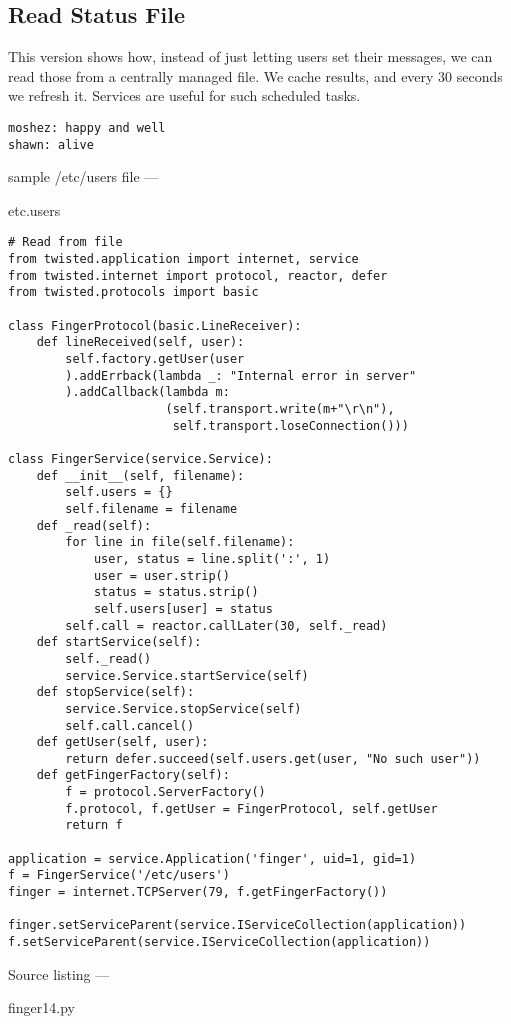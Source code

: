 \subsection{Read Status File}


This version shows how, instead of just letting users set their messages, we can read those from a centrally managed file. We cache results, and every 30 seconds we refresh it. Services are useful for such scheduled tasks.\begin{verbatim}
moshez: happy and well
shawn: alive
\end{verbatim}\parbox[b]{\linewidth}{\begin{center}sample /etc/users file --- \begin{em}etc.users\end{em}\end{center}}\begin{verbatim}
# Read from file
from twisted.application import internet, service
from twisted.internet import protocol, reactor, defer
from twisted.protocols import basic

class FingerProtocol(basic.LineReceiver):
    def lineReceived(self, user):
        self.factory.getUser(user
        ).addErrback(lambda _: "Internal error in server"
        ).addCallback(lambda m:
                      (self.transport.write(m+"\r\n"),
                       self.transport.loseConnection()))

class FingerService(service.Service):
    def __init__(self, filename):
        self.users = {}
        self.filename = filename
    def _read(self):
        for line in file(self.filename):
            user, status = line.split(':', 1)
            user = user.strip()
            status = status.strip()
            self.users[user] = status
        self.call = reactor.callLater(30, self._read)
    def startService(self):
        self._read()
        service.Service.startService(self)
    def stopService(self):
        service.Service.stopService(self)
        self.call.cancel()
    def getUser(self, user):
        return defer.succeed(self.users.get(user, "No such user"))
    def getFingerFactory(self):
        f = protocol.ServerFactory()
        f.protocol, f.getUser = FingerProtocol, self.getUser
        return f

application = service.Application('finger', uid=1, gid=1)
f = FingerService('/etc/users')
finger = internet.TCPServer(79, f.getFingerFactory())

finger.setServiceParent(service.IServiceCollection(application))
f.setServiceParent(service.IServiceCollection(application))
\end{verbatim}\parbox[b]{\linewidth}{\begin{center}Source listing --- \begin{em}finger14.py\end{em}\end{center}}

